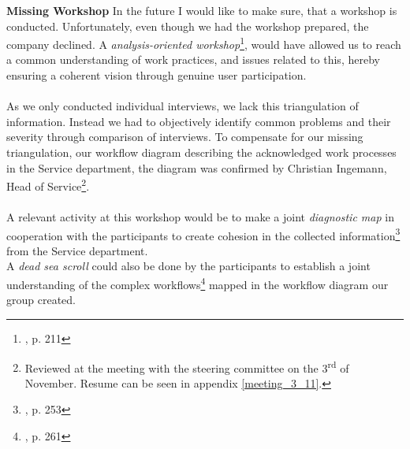 \textbf{Missing Workshop}
In the future I would like to make sure, that a workshop is conducted. Unfortunately, even though we had the workshop prepared, the company declined. A \textit{analysis-oriented workshop}\footnote{\cite{boedker}, p. 211}, would have allowed us to reach a common understanding of work practices, and issues related to this, hereby ensuring a coherent vision through genuine user participation. 
\\\\
As we only conducted individual interviews, we lack this triangulation of information. Instead we had to objectively identify common problems and their severity through comparison of interviews. To compensate for our missing triangulation, our workflow diagram describing the acknowledged work processes in the Service department, the diagram was confirmed by Christian Ingemann, Head of Service\footnote{Reviewed at the meeting with the steering committee on the 3\textsuperscript{rd} of November. Resume can be seen in appendix \ref{meeting_3_11}.}.
\\\\
A relevant activity at this workshop would be to make a joint \textit{diagnostic map} in cooperation with the participants to create cohesion in the collected information\footnote{\cite{boedker}, p. 253} from the Service department.
\\
A \textit{dead sea scroll} could also be done by the participants to establish a joint understanding of the complex workflows\footnote{\cite{boedker}, p. 261} mapped in the workflow diagram our group created.